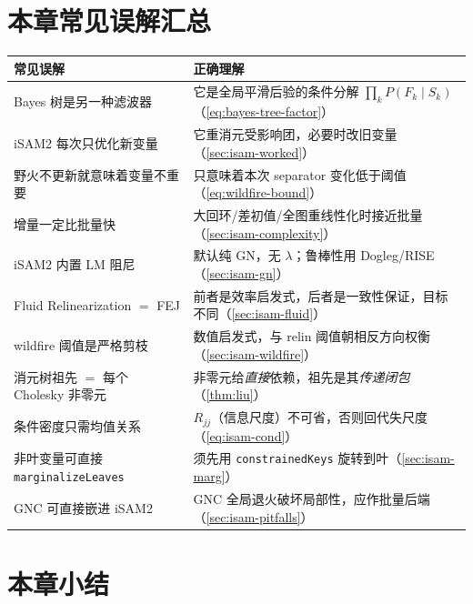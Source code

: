 \section*{本章常见误解汇总}
\begin{table}[H]\centering\small
\begin{tabular}{p{} p{}}
\toprule
\textbf{常见误解} & \textbf{正确理解} \\
\midrule
Bayes 树是另一种滤波器 & 它是全局平滑后验的条件分解 $\prod_k P(F_k\mid S_k)$（\cref{eq:bayes-tree-factor}）\\
iSAM2 每次只优化新变量 & 它重消元受影响团，必要时改旧变量（\cref{sec:isam-worked}）\\
野火不更新就意味着变量不重要 & 只意味着本次 separator 变化低于阈值（\cref{eq:wildfire-bound}）\\
增量一定比批量快 & 大回环/差初值/全图重线性化时接近批量（\cref{sec:isam-complexity}）\\
iSAM2 内置 LM 阻尼 & 默认纯 GN，无 $\lambda$；鲁棒性用 Dogleg/RISE（\cref{sec:isam-gn}）\\
Fluid Relinearization $=$ FEJ & 前者是效率启发式，后者是一致性保证，目标不同（\cref{sec:isam-fluid}）\\
wildfire 阈值是严格剪枝 & 数值启发式，与 relin 阈值朝相反方向权衡（\cref{sec:isam-wildfire}）\\
消元树祖先 $=$ 每个 Cholesky 非零元 & 非零元给\emph{直接}依赖，祖先是其\emph{传递闭包}（\cref{thm:liu}）\\
条件密度只需均值关系 & $R_{jj}$（信息尺度）不可省，否则回代失尺度（\cref{eq:isam-cond}）\\
非叶变量可直接 \texttt{marginalizeLeaves} & 须先用 \texttt{constrainedKeys} 旋转到叶（\cref{sec:isam-marg}）\\
GNC 可直接嵌进 iSAM2 & GNC 全局退火破坏局部性，应作批量后端（\cref{sec:isam-pitfalls}）\\
\bottomrule
\end{tabular}
\end{table}

\section*{本章小结}

